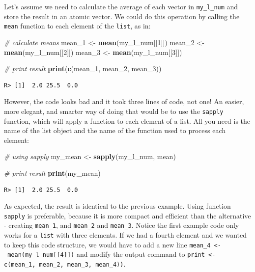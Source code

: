 \documentclass[
  12pt,
]{book}
\newenvironment{Shaded}{\begin{snugshade}}{\end{snugshade}}
\newcommand{\CommentTok}[1]{\textcolor[rgb]{0.37,0.37,0.37}{\textit{#1}}}
\newcommand{\DecValTok}[1]{\textcolor[rgb]{0.06,0.06,0.06}{#1}}
\newcommand{\KeywordTok}[1]{\textcolor[rgb]{0.27,0.27,0.27}{\textbf{#1}}}
\newcommand{\NormalTok}[1]{#1}
\newcommand{\StringTok}[1]{\textcolor[rgb]{0.5,0.5,0.5}{#1}}
\begin{document}
Let's assume we need to calculate the average of each vector in \texttt{my\_l\_num} and store the result in an atomic vector. We could do this operation by calling the \texttt{mean} function to each element of the \texttt{list}, as in: 

\begin{Shaded}
\begin{Highlighting}[]
\CommentTok{# calculate means}
\NormalTok{mean_}\DecValTok{1}\NormalTok{ <-}\StringTok{ }\KeywordTok{mean}\NormalTok{(my_l_num[[}\DecValTok{1}\NormalTok{]])}
\NormalTok{mean_}\DecValTok{2}\NormalTok{ <-}\StringTok{ }\KeywordTok{mean}\NormalTok{(my_l_num[[}\DecValTok{2}\NormalTok{]])}
\NormalTok{mean_}\DecValTok{3}\NormalTok{ <-}\StringTok{ }\KeywordTok{mean}\NormalTok{(my_l_num[[}\DecValTok{3}\NormalTok{]])}

\CommentTok{# print result}
\KeywordTok{print}\NormalTok{(}\KeywordTok{c}\NormalTok{(mean_}\DecValTok{1}\NormalTok{, mean_}\DecValTok{2}\NormalTok{, mean_}\DecValTok{3}\NormalTok{))}
\end{Highlighting}
\end{Shaded}

\begin{verbatim}
R> [1]  2.0 25.5  0.0
\end{verbatim}

However, the code looks bad and it took three lines of code, not one! An easier, more elegant, and smarter way of doing that would be to use the \texttt{sapply} function, which will apply a function to each element of a list. All you need is the name of the list object and the name of the function used to process each element: 

\begin{Shaded}
\begin{Highlighting}[]
\CommentTok{# using sapply}
\NormalTok{my_mean <-}\StringTok{ }\KeywordTok{sapply}\NormalTok{(my_l_num, mean)}

\CommentTok{# print result}
\KeywordTok{print}\NormalTok{(my_mean)}
\end{Highlighting}
\end{Shaded}

\begin{verbatim}
R> [1]  2.0 25.5  0.0
\end{verbatim}

As expected, the result is identical to the previous example. Using function \texttt{sapply} is preferable, because it is more compact and efficient than the alternative - creating \texttt{mean\_1}, and \texttt{mean\_2} and \texttt{mean\_3}. Notice the first example code only works for a \texttt{list} with three elements. If we had a fourth element and we wanted to keep this code structure, we would have to add a new line \texttt{mean\_4\ \textless{}-\ mean(my\_l\_num{[}{[}4{]}{]})} and modify the output command to \texttt{print\ \textless{}-c(mean\_1,\ mean\_2,\ mean\_3,\ mean\_4))}.
\end{document}
